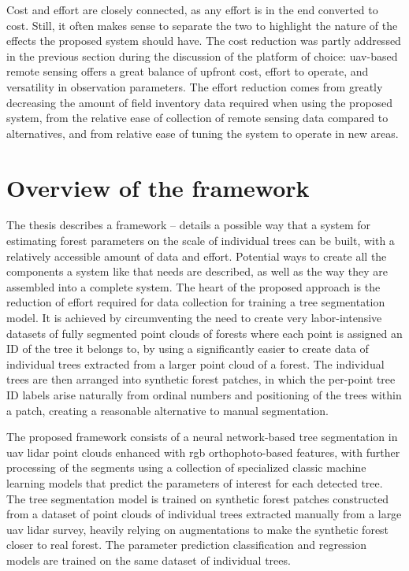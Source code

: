 Cost and effort are closely connected, as any effort is in the end converted to cost.
Still, it often makes sense to separate the two to highlight the nature of the effects the proposed system should have.
The cost reduction was partly addressed in the previous section during the discussion of the platform of choice: \gls{uav}-based remote sensing offers a great balance of upfront cost, effort to operate, and versatility in observation parameters.
The effort reduction comes from greatly decreasing the amount of field inventory data required when using the proposed system, from the relative ease of collection of remote sensing data compared to alternatives, and from relative ease of tuning the system to operate in new areas.

\section{Overview of the framework}

The thesis describes a framework – details a possible way that a system for estimating forest parameters on the scale of individual trees can be built, with a relatively accessible amount of data and effort.
Potential ways to create all the components a system like that needs are described, as well as the way they are assembled into a complete system.
The heart of the proposed approach is the reduction of effort required for data collection for training a tree segmentation model.
It is achieved by circumventing the need to create very labor-intensive datasets of fully segmented point clouds of forests where each point is assigned an ID of the tree it belongs to, by using a significantly easier to create data of individual trees extracted from a larger point cloud of a forest.
The individual trees are then arranged into synthetic forest patches, in which the per-point tree ID labels arise naturally from ordinal numbers and positioning of the trees within a patch, creating a reasonable alternative to manual segmentation.

The proposed framework consists of a neural network-based tree segmentation in \gls{uav} \gls{lidar} point clouds enhanced with \gls{rgb} orthophoto-based features, with further processing of the segments using a collection of specialized classic machine learning models that predict the parameters of interest for each detected tree.
The tree segmentation model is trained on synthetic forest patches constructed from a dataset of point clouds of individual trees extracted manually from a large \gls{uav} \gls{lidar} survey, heavily relying on augmentations to make the synthetic forest closer to real forest.
The parameter prediction classification and regression models are trained on the same dataset of individual trees.

